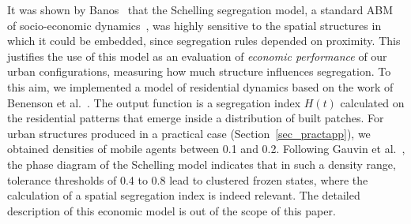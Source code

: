It was shown by Banos~\cite{banos2012network} that the Schelling segregation model, a standard ABM of socio-economic dynamics~\cite{schelling1969models}, was highly sensitive to the spatial structures in which it could be embedded, since segregation rules depended on proximity. This justifies the use of this model as an evaluation of \emph{economic performance} of our urban configurations, measuring how much structure influences segregation. To this aim, we implemented a model of residential dynamics based on the work of Benenson et al.~\cite{benenson1998multi}. The output function is a segregation index $H(t)$ calculated on the residential patterns that emerge inside a distribution of built patches. For urban structures produced in a practical case (Section~\ref{sec_practapp}), we obtained densities of mobile agents between 0.1 and 0.2. Following Gauvin et al.~\cite{gauvin2009phase}, the phase diagram of the Schelling model indicates that in such a density range, tolerance thresholds of 0.4 to 0.8 lead to clustered frozen states, where the calculation of a spatial segregation index is indeed relevant. The detailed description of this economic model is out of the scope of this paper.




